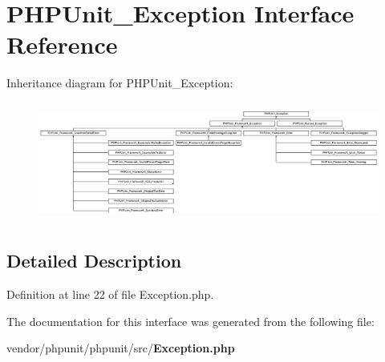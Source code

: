 \section{P\+H\+P\+Unit\+\_\+\+Exception Interface Reference}
\label{interface_p_h_p_unit___exception}
Inheritance diagram for P\+H\+P\+Unit\+\_\+\+Exception\+:\begin{figure}[H]
\begin{center}
\leavevmode
\includegraphics[height=3.948718cm]{interface_p_h_p_unit___exception}
\end{center}
\end{figure}


\subsection{Detailed Description}


Definition at line 22 of file Exception.\+php.



The documentation for this interface was generated from the following file\+:\begin{DoxyCompactItemize}
\item 
vendor/phpunit/phpunit/src/{\bf Exception.\+php}\end{DoxyCompactItemize}
